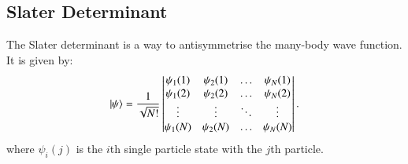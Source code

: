 \subsection{Slater Determinant}
\label{sub:slater_determinant}
The Slater determinant is a way to antisymmetrise the many-body wave function. It is given by:
\begin{equation}
	\ket{\psi} = \frac{1}{\sqrt{N!}} \begin{vmatrix}
		\psi_1(1) & \psi_2(1) & \ldots & \psi_N(1) \\
		\psi_1(2) & \psi_2(2) & \ldots & \psi_N(2) \\
		\vdots & \vdots & \ddots & \vdots \\
		\psi_1(N) & \psi_2(N) & \ldots & \psi_N(N)
        \end{vmatrix}.
\end{equation}
where $ \psi_i(j) $ is the $ i $th single particle state with the $ j $th particle. 


